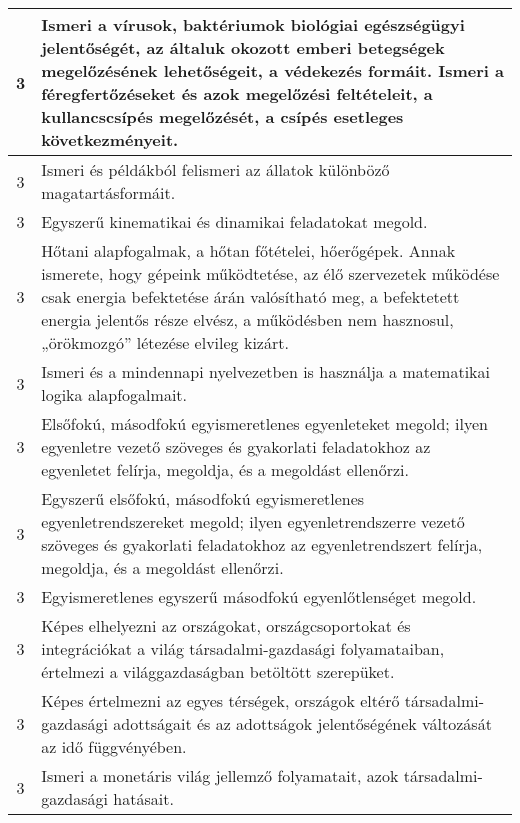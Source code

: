 \begin{longtable}{c | p{12cm} }
                                
                                          3 &  Ismeri a vírusok, baktériumok biológiai egészségügyi jelentőségét, az általuk okozott emberi betegségek megelőzésének lehetőségeit, a védekezés formáit. Ismeri a féregfertőzéseket és azok megelőzési feltételeit, a kullancscsípés megelőzését, a csípés esetleges következményeit. \\ \hline
                                          3 &  Ismeri és példákból felismeri az állatok különböző magatartásformáit. \\ \hline
                                          3 &  Egyszerű kinematikai és dinamikai feladatokat megold. \\ \hline
                                          3 &  Hőtani alapfogalmak, a hőtan főtételei, hőerőgépek. Annak ismerete, hogy gépeink működtetése, az élő szervezetek működése csak energia befektetése árán valósítható meg, a befektetett energia jelentős része elvész, a működésben nem hasznosul, „örökmozgó” létezése elvileg kizárt. \\ \hline
                                          3 &  Ismeri és a mindennapi nyelvezetben is használja a matematikai logika alapfogalmait. \\ \hline
                                          3 &  Elsőfokú, másodfokú egyismeretlenes egyenleteket megold; ilyen egyenletre vezető szöveges és gyakorlati feladatokhoz az egyenletet felírja, megoldja, és a megoldást ellenőrzi. \\ \hline
                                          3 &  Egyszerű elsőfokú, másodfokú egyismeretlenes egyenletrendszereket megold; ilyen egyenletrendszerre vezető szöveges és gyakorlati feladatokhoz az egyenletrendszert felírja, megoldja, és a megoldást ellenőrzi. \\ \hline
                                          3 &  Egyismeretlenes egyszerű másodfokú egyenlőtlenséget megold. \\ \hline
                                          3 &  Képes elhelyezni az országokat, országcsoportokat és integrációkat a világ társadalmi-gazdasági folyamataiban, értelmezi a világgazdaságban betöltött szerepüket. \\ \hline
                                          3 &  Képes értelmezni az egyes térségek, országok eltérő társadalmi-gazdasági adottságait és az adottságok jelentőségének változását az idő függvényében. \\ \hline
                                          3 &  Ismeri a monetáris világ jellemző folyamatait, azok társadalmi-gazdasági hatásait. \\ \hline

\end{longtable}
